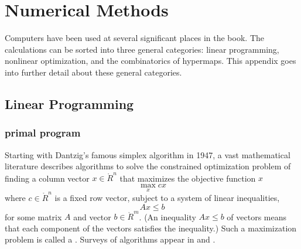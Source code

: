 %
\chapter{Numerical Methods}

Computers have been used at several significant places in the book.     The calculations
can be sorted into three general categories: linear programming, nonlinear
optimization, and the combinatorics of hypermaps. This
appendix goes into further detail about these general categories.  


\section{Linear Programming}

\subsection{primal program}

Starting with Dantzig's famous simplex algorithm in 1947, 
a vast mathematical literature describes algorithms to
solve the constrained optimization problem of finding a column vector
$x\in\ring{R}^n$ that maximizes the objective function $ x$
\begin{equation}\label{eqn:lp1}
\max_{x}  c x
\end{equation}
where $c\in\ring{R}^n$ is a fixed row vector, subject to a system of
linear inequalities,
\begin{equation}\label{eqn:lp2}
A x\le b
\end{equation} 
for some matrix $A$ and vector $b\in \ring{R}^m$.  (An inequality $A
x\le b$ of vectors means that each component of the vectors satisfies the
inequality.)  Such a maximization problem is called a .  Surveys of algorithms appear in \cite{Wri05} and
\cite{Tod02}.

%

